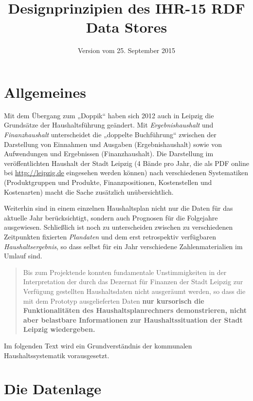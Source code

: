 \documentclass[a4paper,11pt,twoside]{article}
\title{Designprinzipien des IHR-15 RDF Data Stores}
\date{Version vom 25. September 2015}
\begin{document}
\maketitle
\tableofcontents
\thispagestyle{empty}
\newpage
\seitezwei
\newpage

\section{Allgemeines}

Mit dem Übergang zum „Doppik“ haben sich 2012 auch in Leipzig die Grundsätze
der Haushaltsführung geändert.  Mit \emph{Ergebnishaushalt} und
\emph{Finanzhaushalt} unterscheidet die „doppelte Buchführung“ zwischen der
Darstellung von Einnahmen und Ausgaben (Ergebnishaushalt) sowie von
Aufwendungen und Ergebnissen (Finanzhaushalt).  Die Darstellung im
veröffentlichten Haushalt der Stadt Leipzig (4 Bände pro Jahr, die als PDF
online bei \url{http://leipzig.de} eingesehen werden können) nach
verschiedenen Systematiken (Produktgruppen und Produkte, Finanzpositionen,
Kostenstellen und Kostenarten) macht die Sache zusätzlich unübersichtlich.

Weiterhin sind in einem einzelnen Haushaltsplan nicht nur die Daten für das
aktuelle Jahr berücksichtigt, sondern auch Prognosen für die Folgejahre
ausgewiesen.  Schließlich ist noch zu unterscheiden zwischen zu verschiedenen
Zeitpunkten fixierten \emph{Plandaten} und dem erst retrospektiv verfügbaren
\emph{Haushaltsergebnis}, so dass selbst für ein Jahr verschiedene
Zahlenmaterialien im Umlauf sind.

\begin{quote}
  Bis zum Projektende konnten fundamentale Unstimmigkeiten in der
  Interpretation der durch das Dezernat für Finanzen der Stadt Leipzig zur
  Verfügung gestellten Haushaltsdaten nicht ausgeräumt werden, so dass die mit
  dem Prototyp ausgelieferten Daten \textbf{nur kursorisch die Funktionalitäten
    des Haushaltsplanrechners demonstrieren, nicht aber belastbare
    Informationen zur Haushaltssituation der Stadt Leipzig wiedergeben.}
\end{quote}


Im folgenden Text wird ein Grundverständnis der kommunalen Haushaltssystematik
vorausgesetzt.

\section{Die Datenlage}
\end{document}
